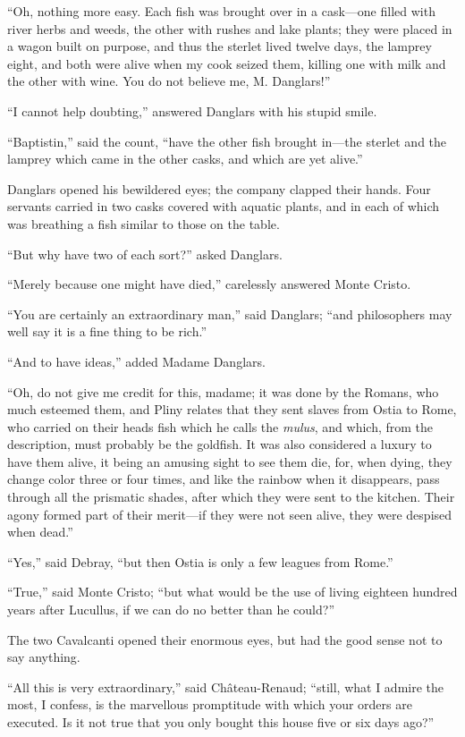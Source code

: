 “Oh, nothing more easy. Each fish was brought over in a cask—one filled
with river herbs and weeds, the other with rushes and lake plants; they
were placed in a wagon built on purpose, and thus the sterlet lived
twelve days, the lamprey eight, and both were alive when my cook seized
them, killing one with milk and the other with wine. You do not believe
me, M. Danglars!”

“I cannot help doubting,” answered Danglars with his stupid smile.

“Baptistin,” said the count, “have the other fish brought in—the
sterlet and the lamprey which came in the other casks, and which are
yet alive.”

Danglars opened his bewildered eyes; the company clapped their hands.
Four servants carried in two casks covered with aquatic plants, and in
each of which was breathing a fish similar to those on the table.

“But why have two of each sort?” asked Danglars.

“Merely because one might have died,” carelessly answered Monte Cristo.

“You are certainly an extraordinary man,” said Danglars; “and
philosophers may well say it is a fine thing to be rich.”

“And to have ideas,” added Madame Danglars.

“Oh, do not give me credit for this, madame; it was done by the Romans,
who much esteemed them, and Pliny relates that they sent slaves from
Ostia to Rome, who carried on their heads fish which he calls the
\textit{mulus}, and which, from the description, must probably be the
goldfish. It was also considered a luxury to have them alive, it being
an amusing sight to see them die, for, when dying, they change color
three or four times, and like the rainbow when it disappears, pass
through all the prismatic shades, after which they were sent to the
kitchen. Their agony formed part of their merit—if they were not seen
alive, they were despised when dead.”

“Yes,” said Debray, “but then Ostia is only a few leagues from Rome.”

“True,” said Monte Cristo; “but what would be the use of living
eighteen hundred years after Lucullus, if we can do no better than he
could?”

The two Cavalcanti opened their enormous eyes, but had the good sense
not to say anything.

“All this is very extraordinary,” said Château-Renaud; “still, what I
admire the most, I confess, is the marvellous promptitude with which
your orders are executed. Is it not true that you only bought this
house five or six days ago?”

